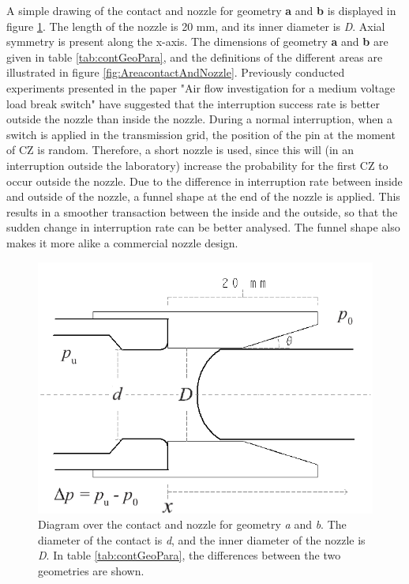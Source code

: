 \documentclass[10pt,b5paper,twoside]{article}
\begin{document}
A simple drawing of the contact and nozzle for geometry \textbf{a} and \textbf{b} is displayed in figure \ref{fig:contactAndNozzle}. The length of the nozzle is 20 mm, and its inner diameter is \textit{D}. Axial symmetry is present along the x-axis. The dimensions of geometry \textbf{a} and \textbf{b} are given in table \ref{tab:contGeoPara}, and the definitions of the different areas are illustrated in figure \ref{fig:AreacontactAndNozzle}. Previously conducted experiments presented in the paper "Air flow investigation for a medium voltage load break switch" \cite{bib:AFIMVLBA} have suggested that the interruption success rate is better outside the nozzle than inside the nozzle. During a normal interruption, when a switch is applied in the transmission grid, the position of the pin at the moment of CZ is random. Therefore, a short nozzle is used, since this will (in an interruption outside the laboratory) increase the probability for the first CZ to occur outside the nozzle. Due to the difference in interruption rate between inside and outside of the nozzle, a funnel shape at the end of the nozzle is applied. This results in a smoother transaction between the inside and the outside, so that the sudden change in interruption rate can be better analysed. The funnel shape also makes it more alike a commercial nozzle design.


\begin{figure} [h]
\centering
\includegraphics[scale=0.45]{Bilder/Method/ContactAndNozzleFunnelShape5.png}
\caption{Diagram over the contact and nozzle for geometry \textit{a} and \textit{b}. The diameter of the contact is \textit{d}, and the inner diameter of the nozzle is \textit{D}. In table \ref{tab:contGeoPara}, the differences between the two geometries are shown.} \label{fig:contactAndNozzle}
\end{figure}
\end{document}
